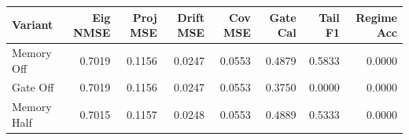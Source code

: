 \begin{tabular}{lrrrrrrr}
\toprule
Variant & Eig NMSE & Proj MSE & Drift MSE & Cov MSE & Gate Cal & Tail F1 & Regime Acc \\
\midrule
Memory Off & 0.7019 & 0.1156 & 0.0247 & 0.0553 & 0.4879 & 0.5833 & 0.0000 \\
Gate Off & 0.7019 & 0.1156 & 0.0247 & 0.0553 & 0.3750 & 0.0000 & 0.0000 \\
Memory Half & 0.7015 & 0.1157 & 0.0248 & 0.0553 & 0.4889 & 0.5333 & 0.0000 \\
\bottomrule
\end{tabular}